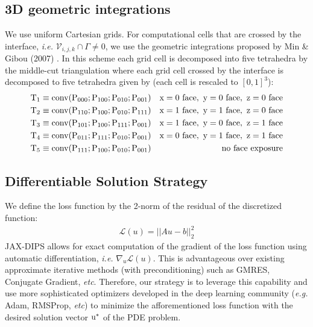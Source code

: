 \documentclass{elsarticle}
\begin{document}
\subsection{3D geometric integrations}
We use uniform Cartesian grids. For computational cells that are crossed by the interface, \textit{i.e.} $\mathcal{V}_{i,j,k}\cap \Gamma \neq 0$, we use the geometric integrations proposed by Min \& Gibou (2007) \cite{min2007geometric}. In this scheme each grid cell is decomposed into five tetrahedra by the middle-cut triangulation \cite{sallee1984middle} where each grid cell crossed by the interface is decomposed to five tetrahedra given by (each cell is rescaled to $[0,1]^3$):
\begin{align*}
	 & \rm T_1 \equiv conv(P_{000} ; P_{100} ; P_{010} ; P_{001}) & \rm{ x = 0\ face,\ y = 0\ face,\ z = 0\ face} \\
	 & \rm T_2 \equiv conv(P_{110} ; P_{100} ; P_{010} ; P_{111}) & \rm{ x = 1\ face,\ y = 1\ face,\ z = 0\ face} \\
	 & \rm T_3 \equiv conv(P_{101} ; P_{100} ; P_{111} ; P_{001}) & \rm{ x = 1\ face,\ y = 0\ face,\ z = 1\ face} \\
	 & \rm T_4 \equiv conv(P_{011} ; P_{111} ; P_{010} ; P_{001}) & \rm{ x = 0\ face,\ y = 1\ face,\ z = 1\ face} \\
	 & \rm T_5\equiv conv(P_{111} ; P_{100} ; P_{010} ; P_{001})  & \rm{ no\ face\ exposure}
\end{align*}



\subsection{Differentiable Solution Strategy}

We define the loss function by the 2-norm of the residual of the discretized function:
\begin{align*}
	\mathcal{L}(u) = \vert\vert Au - b\vert\vert_2^2
\end{align*}
JAX-DIPS allows for exact computation of the gradient of the loss function using automatic differentiation, \textit{i.e.} $\nabla_u \mathcal{L}(u)$. This is advantageous over existing approximate iterative methods (with preconditioning) such as GMRES, Conjugate Gradient, \textit{etc}. Therefore, our strategy is to leverage this capability and use more sophisticated optimizers developed in the deep learning community (\textit{e.g.} Adam, RMSProp, \textit{etc}) to minimize the afforementioned loss function with the desired solution vector $\rm u^\ast$ of the PDE problem.
\end{document}
